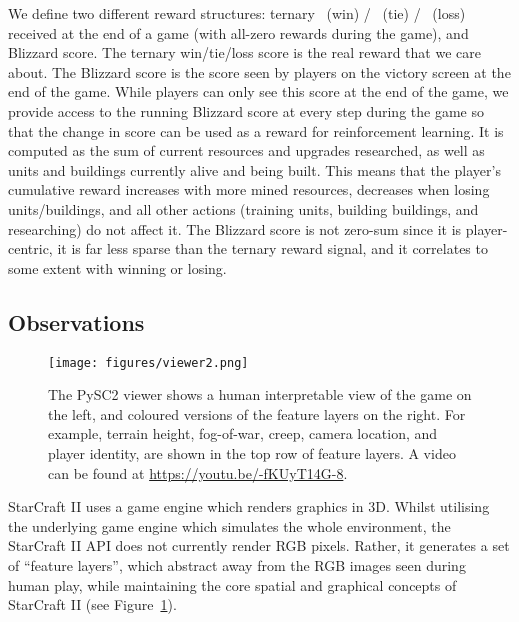 \documentclass{article}
\begin{document}
We define two different reward structures: ternary ~(win) / ~(tie) / ~(loss) received at the end of a game (with all-zero rewards during the game), and Blizzard score. The ternary win/tie/loss score is the real reward that we care about. The Blizzard score is the score seen by players on the victory screen at the end of the game. While players can only see this score at the end of the game, we provide access to the running Blizzard score at every step during the game so that the change in score can be used as a reward for reinforcement learning. It is computed as the sum of current resources and upgrades researched, as well as units and buildings currently alive and being built. This means that the player's cumulative reward increases with more mined resources, decreases when losing units/buildings, and all other actions (training units, building buildings, and researching) do not affect it. The Blizzard score is not zero-sum since it is player-centric, it is far less sparse than the ternary reward signal, and it correlates to some extent with winning or losing.

\subsection{Observations}

\begin{figure}
    \centering
    \texttt{[image: figures/viewer2.png]}
    \caption{The PySC2 viewer shows a human interpretable view of the game on the left, and coloured versions of the feature layers on the right.  For example, terrain height, fog-of-war, creep, camera location, and player identity, are shown in the top row of feature layers. A video can be found at \url{https://youtu.be/-fKUyT14G-8}.
    }
    \label{fig:viewer}
\end{figure}


StarCraft II uses a game engine which renders graphics in 3D. Whilst utilising the underlying game engine which simulates the whole environment, the StarCraft II API does not currently render RGB pixels. Rather, it generates a set of ``feature layers'', which abstract away from the RGB images seen during human play, while maintaining the core spatial and graphical concepts of StarCraft II (see Figure~\ref{fig:viewer}). 
\end{document}
